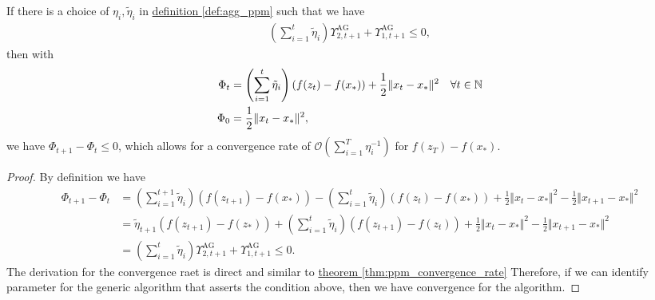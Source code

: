 \documentclass[12pt]{article}
\begin{document}
        \begin{theorem}
        \label{thm:generic_ag_convergence}
            If there is a choice of $\eta_i, \tilde \eta_i$ in \hyperref[def:agg_ppm]{definition \ref*{def:agg_ppm}} such that we have 
            \begin{align*}
                \left(
                    \sum_{i = 1}^{t} \tilde \eta_i
                \right)
                \Upsilon_{2, t + 1}^{\text{AG}} + 
                \Upsilon_{1, t + 1}^{\text{AG}} \le 0, 
            \end{align*}
            then with 
            \begin{align*}
                \Phi_t &= \left(
                    \sum_{i = 1}^{t} \tilde\eta_{i}
                \right) (f(z_t) - f(x_*)) + \frac{1}{2}\Vert x_t - x_*\Vert^2 \quad \forall t \in \mathbb N
                \\
                \Phi_0 &= \frac{1}{2}\Vert x_t - x_*\Vert^2, 
            \end{align*}
            we have $\Phi_{t + 1} - \Phi_t \le 0$, which allows for a convergence rate of $\mathcal O \left(\sum_{i = 1}^{T} \eta_i^{-1}\right)$ for $f(z_T) - f(x_*)$. 
        \end{theorem}
        \begin{proof}
            By definition we have
            {\footnotesize
            \begin{align*}
                \Phi_{t + 1} - \Phi_t 
                &= 
                \left(
                    \sum_{i = 1}^{t+1} \tilde\eta_{i}
                \right) (f(z_{t + 1}) - f(x_*)) 
                - 
                \left(
                    \sum_{i = 1}^{t} \tilde\eta_{i}
                \right) (f(z_{t}) - f(x_*)) 
                + \frac{1}{2}\Vert x_t - x_*\Vert^2
                - \frac{1}{2}\Vert x_{t + 1} - x_*\Vert^2
                \\
                &= 
                \tilde \eta_{t + 1} (f(z_{t + 1}) - f(z_*))
                +
                \left(
                    \sum_{i = 1}^{t} \tilde \eta_i
                \right)(f(z_{t + 1}) - f(z_t))
                + \frac{1}{2}\Vert x_t - x_*\Vert^2
                - \frac{1}{2}\Vert x_{t + 1} - x_*\Vert^2
                \\
                &= \left(
                    \sum_{i = 1}^{t} \tilde \eta_i
                \right)\Upsilon_{2, t + 1}^{\text{AG}} + \Upsilon_{1, t + 1}^{\text{AG}} \le 0. 
            \end{align*}
            }
            The derivation for the convergence raet is direct and similar to 
            \hyperref[thm:ppm_convergence_rate]{theorem \ref*{thm:ppm_convergence_rate}} 
            Therefore, if we can identify parameter for the generic algorithm that asserts the condition above, then we have convergence for the algorithm. 
        \end{proof}
\end{document}
